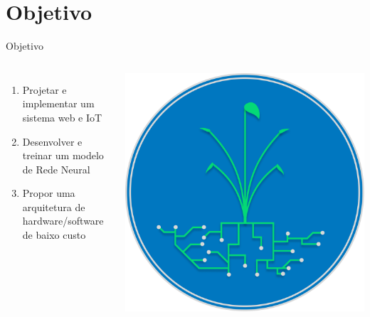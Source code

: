 \documentclass[10pt]{beamer}
\begin{document}
\section{Objetivo}
\begin{frame}{Objetivo}

\begin{columns}[T,onlytextwidth]
    \begin{enumerate}
        \setlength{\itemsep}{10pt}
        \item Projetar e implementar um sistema web e IoT
        \item Desenvolver e treinar um modelo de Rede Neural
        \item Propor uma arquitetura de hardware/software de baixo custo
    \end{enumerate}

    \centering
    \includegraphics[width=0.7\linewidth]{imagens/LOGO PI.png}  %
\end{columns}

\end{frame}

\end{document}
